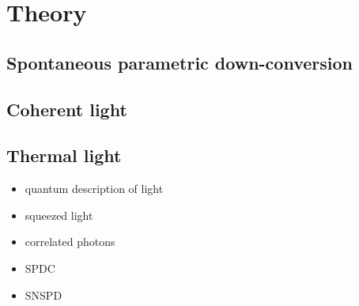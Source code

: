 \section{Theory}
\subsection{Spontaneous parametric down-conversion }
\subsection{Coherent light}
\subsection{Thermal light}
\begin{itemize}
    \item quantum description of light
    \item squeezed light
    \item correlated photons
    \item SPDC
    \item SNSPD
\end{itemize}

